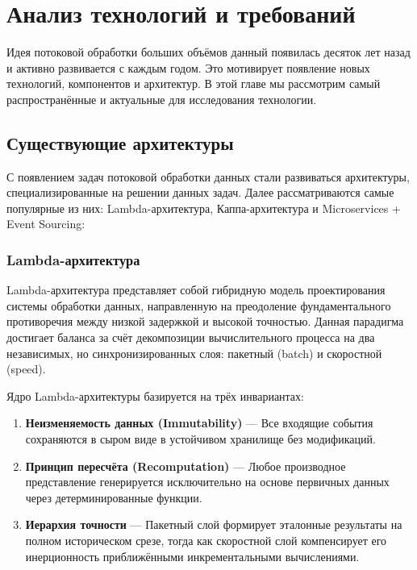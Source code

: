 \section{Анализ технологий и требований}
\label{sec:Chapter2} 
    Идея потоковой обработки больших объёмов данный появилась десяток лет назад и активно развивается с каждым годом. Это мотивирует появление новых технологий, компонентов и архитектур. В этой главе мы рассмотрим самый распространённые и актуальные для исследования технологии.   

    \subsection{Существующие архитектуры}
        С появлением задач потоковой обработки данных стали развиваться архитектуры, специализированные на решении данных задач. Далее рассматриваются самые популярные из них: Lambda-архитектура, Каппа-архитектура и Microservices + Event Sourcing:
        \subsubsection{Lambda-архитектура}
            Lambda-архитектура представляет собой гибридную модель проектирования системы обработки данных, направленную на преодоление фундаментального противоречия между низкой задержкой и высокой точностью. Данная парадигма достигает баланса за счёт декомпозиции вычислительного процесса на два независимых, но синхронизированных слоя: пакетный (batch) и скоростной (speed).
            
            Ядро Lambda-архитектуры базируется на трёх инвариантах:
            \begin{enumerate}
                \item \textbf{Неизменяемость данных (Immutability)} — Все входящие события сохраняются в сыром виде в устойчивом хранилище без модификаций.
                \item \textbf{Принцип пересчёта (Recomputation)} — Любое производное представление генерируется исключительно на основе первичных данных через детерминированные функции.
                \item \textbf{Иерархия точности} — Пакетный слой формирует эталонные результаты на полном историческом срезе, тогда как скоростной слой компенсирует его инерционность приближёнными инкрементальными вычислениями.
            \end{enumerate}
            
